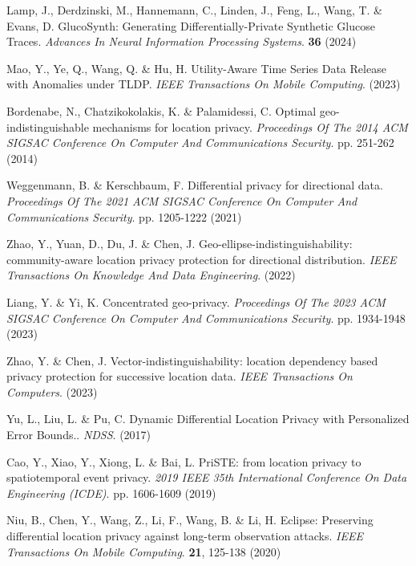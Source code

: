\begin{thebibliography}{10}
\begin{small}
Lamp, J., Derdzinski, M., Hannemann, C., Linden, J., Feng, L., Wang, T. \& Evans, D. GlucoSynth: Generating Differentially-Private Synthetic Glucose Traces. {\em Advances In Neural Information Processing Systems}. \textbf{36} (2024)

 Mao, Y., Ye, Q., Wang, Q. \& Hu, H. Utility-Aware Time Series Data Release with Anomalies under TLDP. {\em IEEE Transactions On Mobile Computing}. (2023)





Bordenabe, N., Chatzikokolakis, K. \& Palamidessi, C. Optimal geo-indistinguishable mechanisms for location privacy. {\em Proceedings Of The 2014 ACM SIGSAC Conference On Computer And Communications Security}. pp. 251-262 (2014)

Weggenmann, B. \& Kerschbaum, F. Differential privacy for directional data. {\em Proceedings Of The 2021 ACM SIGSAC Conference On Computer And Communications Security}. pp. 1205-1222 (2021)

Zhao, Y., Yuan, D., Du, J. \& Chen, J. Geo-ellipse-indistinguishability: community-aware location privacy protection for directional distribution. {\em IEEE Transactions On Knowledge And Data Engineering}. (2022)

Liang, Y. \& Yi, K. Concentrated geo-privacy. {\em Proceedings Of The 2023 ACM SIGSAC Conference On Computer And Communications Security}. pp. 1934-1948 (2023)

Zhao, Y. \& Chen, J. Vector-indistinguishability: location dependency based privacy protection for successive location data. {\em IEEE Transactions On Computers}. (2023)

Yu, L., Liu, L. \& Pu, C. Dynamic Differential Location Privacy with Personalized Error Bounds.. {\em NDSS}. (2017)

Cao, Y., Xiao, Y., Xiong, L. \& Bai, L. PriSTE: from location privacy to spatiotemporal event privacy. {\em 2019 IEEE 35th International Conference On Data Engineering (ICDE)}. pp. 1606-1609 (2019)

Niu, B., Chen, Y., Wang, Z., Li, F., Wang, B. \& Li, H. Eclipse: Preserving differential location privacy against long-term observation attacks. {\em IEEE Transactions On Mobile Computing}. \textbf{21}, 125-138 (2020)


\end{small}
\end{thebibliography}

